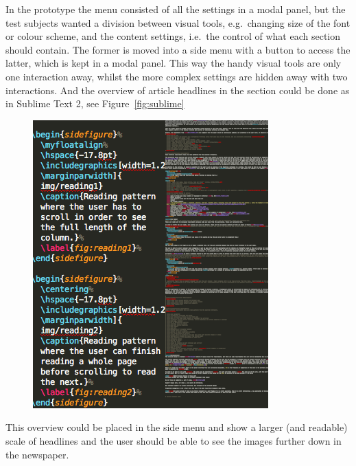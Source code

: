 In the prototype the menu consisted of all the settings in a modal panel, but the test subjects wanted a division between visual tools, e.g.\ changing size of the font or colour scheme, and the content settings, i.e.\ the control of what each section should contain. The former is moved into a side menu with a button to access the latter, which is kept in a modal panel. This way the handy visual tools are only one interaction away, whilst the more complex settings are hidden away with two interactions. And the overview of article headlines in the section could be done as in Sublime Text 2, see Figure~\ref{fig:sublime}
\begin{figure}[h!tp]
	\myfloatalign
	\includegraphics[width=.5\textwidth]{img/sublime}
\end{figure}
This overview could be placed in the side menu and show a larger (and readable) scale of headlines and the user should be able to see the images further down in the newspaper.


